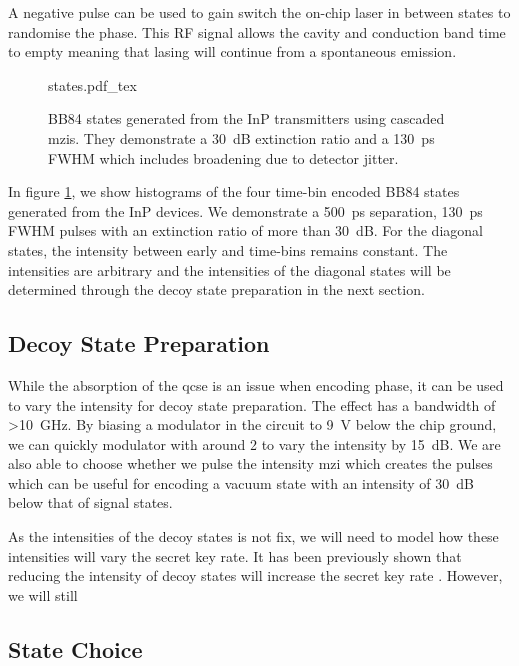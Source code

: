 A negative pulse can be used to gain switch the on-chip laser in between states to randomise the phase. This RF signal allows the cavity and conduction band time to empty meaning that lasing will continue from a spontaneous emission.  

\begin{figure}[tbp]
	\centering
	\small
	\def\svgwidth{\textwidth} 
	{states.pdf_tex}
	\caption[BB84 states generated from the InP transmitters]{BB84 states generated from the \ac{InP} transmitters using cascaded \acp{mzi}. They demonstrate a \SI{30}{dB} extinction ratio and a \SI{130}{\ps} \ac{FWHM} which includes broadening due to detector jitter.}
	\label{fig:states}
\end{figure}

In figure \ref{fig:states}, we show histograms of the four time-bin encoded BB84 states generated from the \ac{InP} devices. We demonstrate a \SI{500}{ps} separation, \SI{130}{ps} \ac{FWHM} pulses with an extinction ratio of more than \SI{30}{dB}. For the diagonal states, the intensity between early and time-bins remains constant. The intensities are arbitrary and the intensities of the diagonal states will be determined through the decoy state preparation in the next section.

\subsection{Decoy State Preparation}

While the absorption of the \ac{qcse} is an issue when encoding phase, it can be used to vary the intensity for decoy state preparation. The effect has a bandwidth of \SI{>10}{\GHz}. By biasing a modulator in the circuit to \SI{9}{\V} below the chip ground, we can quickly modulator with around \SI{2}{\Vpp} to vary the intensity by \SI{15}{dB}. We are also able to choose whether we pulse the intensity \ac{mzi} which creates the pulses which can be useful for encoding a vacuum state with an intensity of \SI{30}{dB} below that of signal states.

As the intensities of the decoy states is not fix, we will need to model how these intensities will vary the secret key rate. It has been previously shown that reducing the intensity of decoy states will increase the secret key rate \cite{Chan2014}. However, we will still 

\subsection{State Choice}

